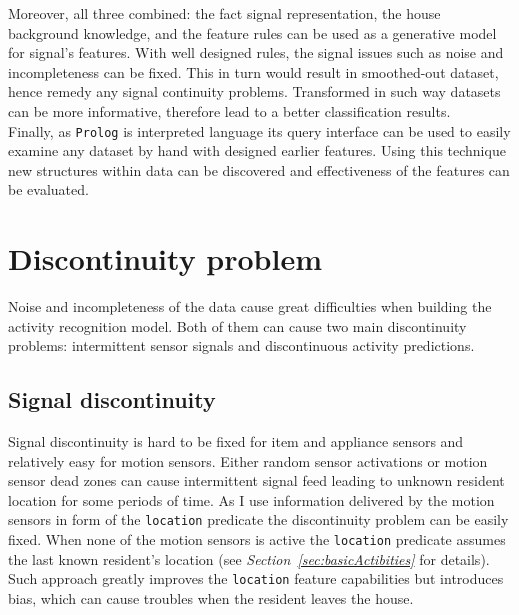 \documentclass[10pt, a4paper, pdflatex, leqno, twoside, openright]{report}
\begin{document}
Moreover, all three combined: the fact signal representation, the house background knowledge, and the feature rules can be used as a generative model for signal's features. With well designed rules, the signal issues such as noise and incompleteness can be fixed. This in turn would result in smoothed-out dataset, hence remedy any signal continuity problems. Transformed in such way datasets can be more informative, therefore lead to a better classification results.\\

Finally, as \texttt{Prolog} is interpreted language its query interface can be used to easily examine any dataset by hand with designed earlier features. Using this technique new structures within data can be discovered and effectiveness of the features can be evaluated.

  \section{Discontinuity problem\label{sec:predictionDiscontinuity}}
Noise and incompleteness of the data cause great difficulties when building the activity recognition model. Both of them can cause two main discontinuity problems: intermittent sensor signals and discontinuous activity predictions.

    \subsection{Signal discontinuity}
Signal discontinuity is hard to be fixed for item and appliance sensors and relatively easy for motion sensors. Either random sensor activations or motion sensor dead zones can cause intermittent signal feed leading to unknown resident location for some periods of time. As I use information delivered by the motion sensors in form of the \texttt{location} predicate the discontinuity problem can be easily fixed. When none of the motion sensors is active the \texttt{location} predicate assumes the last known resident's location (see \emph{Section~\ref{sec:basicActibities}} for details). Such approach greatly improves the \texttt{location} feature capabilities but introduces bias, which can cause troubles when the resident leaves the house.
\end{document}
